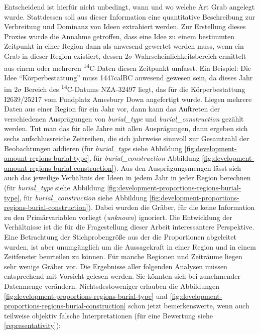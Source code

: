 \documentclass[openany,twoside,twocolumn]{book}
\begin{document}
Entscheidend ist hierfür nicht unbedingt, wann und wo welche Art Grab
angelegt wurde. Stattdessen soll aus dieser Information eine
quantitative Beschreibung zur Verbreitung und Dominanz von Ideen
extrahiert werden. Zur Erstellung dieses Proxies wurde die Annahme
getroffen, dass eine Idee zu einem bestimmten Zeitpunkt in einer Region
dann als anwesend gewertet werden muss, wenn ein Grab in dieser Region
existiert, dessen \(2\sigma\) Wahrscheinlichkeitsbereich ermittelt aus
einem oder mehreren \textsuperscript{14}C-Daten diesen Zeitpunkt
umfasst. Ein Beispiel: Die Idee ``Körperbestattung'' muss 1447calBC
anwesend gewesen sein, da dieses Jahr im \(2\sigma\) Bereich des
\textsuperscript{14}C-Datums NZA-32497 liegt, das für die
Körperbestattung I2639/25217 vom Fundplatz Amesbury Down angefertigt
wurde. Liegen mehrere Daten aus einer Region für ein Jahr vor, dann kann
das Auftreten der verschiedenen Ausprägungen von \emph{burial\_type} und
\emph{burial\_construction} gezählt werden. Tut man das für alle Jahre
mit allen Ausprägungen, dann ergeben sich sechs aufschlussreiche
Zeitreihen, die sich jahrweise sinnvoll zur Gesamtzahl der Beobachtungen
addieren (für \emph{burial\_type} siehe Abbildung
\ref{fig:development-amount-regions-burial-type}, für
\emph{burial\_construction} Abbildung
\ref{fig:development-amount-regions-burial-construction}). Aus den
Ausprägungsmengen lässt sich auch das jeweilige Verhältnis der Ideen in
jedem Jahr in jeder Region berechnen (für \emph{burial\_type} siehe
Abbildung \ref{fig:development-proportions-regions-burial-type}, für
\emph{burial\_construction} siehe Abbildung
\ref{fig:development-proportions-regions-burial-construction}). Dabei
wurden die Gräber, für die keine Information zu den Primärvariablen
vorliegt (\emph{unknown}) ignoriert. Die Entwicklung der Verhältnisse
ist die für die Fragestellung dieser Arbeit interessantere Perspektive.
Eine Betrachtung der Stichprobengröße aus der die Proportionen
abgeleitet wurden, ist aber unumgänglich um die Aussagekraft in einer
Region und in einem Zeitfenster beurteilen zu können. Für manche
Regionen und Zeiträume liegen sehr wenige Gräber vor. Die Ergebnisse
aller folgenden Analysen müssen entsprechend mit Vorsicht gelesen
werden. Sie könnten sich bei zunehmender Datenmenge verändern.
Nichtsdestoweniger erlauben die Abbildungen
\ref{fig:development-proportions-regions-burial-type} und
\ref{fig:development-proportions-regions-burial-construction} schon
jetzt bemerkenswerte, wenn auch teilweise objektiv falsche
Interpretationen (für eine Bewertung siehe \ref{representativity}):
\end{document}
